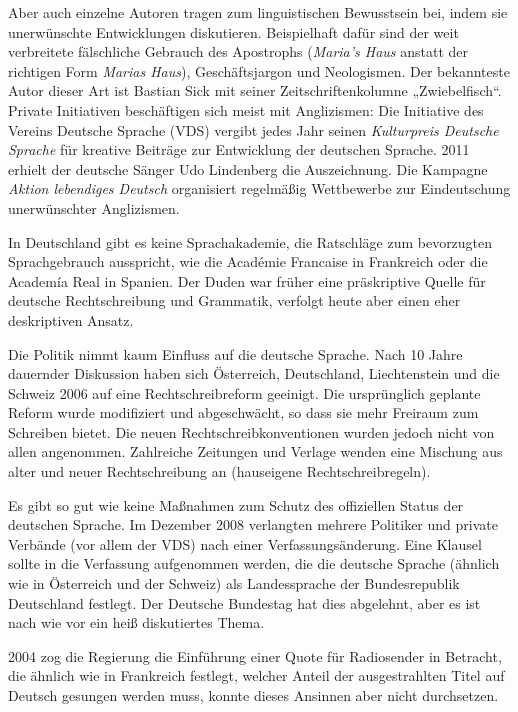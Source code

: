 \documentclass[]{../../metanetpaper}
\begin{document}
\begin{Parallel}[c]{80mm}{80mm}
{Aber auch einzelne Autoren tragen zum linguistischen Bewusstsein bei, indem sie unerwünschte Entwicklungen diskutieren. Beispielhaft dafür sind der weit verbreitete fälschliche Gebrauch des Apostrophs (\textit{Maria’s Haus} anstatt der richtigen Form \textit{Marias Haus}), Geschäftsjargon und Neologismen. Der bekannteste Autor dieser Art ist Bastian Sick mit seiner Zeitschriftenkolumne „Zwiebelfisch“. Private Initiativen beschäftigen sich meist mit Anglizismen: Die Initiative des Vereins Deutsche Sprache (VDS) vergibt jedes Jahr seinen \textit{Kulturpreis Deutsche Sprache} für kreative Beiträge zur Entwicklung der deutschen Sprache. 2011 erhielt der deutsche Sänger Udo Lindenberg die Auszeichnung. Die Kampagne \textit{Aktion lebendiges Deutsch} organisiert regelmäßig Wettbewerbe zur Eindeutschung unerwünschter Anglizismen. 

In Deutschland gibt es keine Sprachakademie, die Ratschläge zum bevorzugten Sprachgebrauch ausspricht, wie die Académie Francaise in Frankreich oder die Academía Real in Spanien. Der Duden war früher eine präskriptive Quelle für deutsche Rechtschreibung und Grammatik, verfolgt heute aber einen eher deskriptiven Ansatz. 

Die Politik nimmt kaum Einfluss auf die deutsche Sprache. Nach 10 Jahre dauernder Diskussion haben sich Österreich, Deutschland, Liechtenstein und die Schweiz 2006 auf eine Rechtschreibreform geeinigt. Die ursprünglich geplante Reform wurde modifiziert und abgeschwächt, so dass sie mehr Freiraum zum Schreiben bietet. Die neuen Rechtschreibkonventionen wurden jedoch nicht von allen angenommen. Zahlreiche Zeitungen und Verlage wenden eine Mischung aus alter und neuer Rechtschreibung an (hauseigene Rechtschreibregeln).

Es gibt so gut wie keine Maßnahmen zum Schutz des offiziellen Status der deutschen Sprache. Im Dezember 2008 verlangten mehrere Politiker und private Verbände (vor allem der VDS) nach einer Verfassungsänderung. Eine Klausel sollte in die Verfassung aufgenommen werden, die die deutsche Sprache (ähnlich wie in Österreich und der Schweiz) als Landessprache der Bundesrepublik Deutschland festlegt. Der Deutsche Bundestag hat dies abgelehnt, aber es ist nach wie vor ein heiß diskutiertes Thema. 

2004 zog die Regierung die Einführung einer Quote für Radiosender in Betracht, die ähnlich wie in Frankreich festlegt, welcher Anteil der ausgestrahlten Titel auf Deutsch gesungen werden muss, konnte dieses Ansinnen aber nicht durchsetzen.

}
\end{Parallel}
\end{document}
